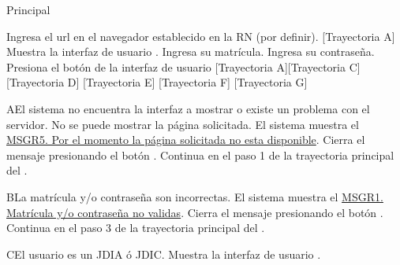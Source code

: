 \begin{UCtrayectoria}{Principal}
    
    \UCpaso[\UCactor] Ingresa el url en el navegador establecido en la RN (por definir). [Trayectoria A] 
    \UCpaso Muestra la interfaz de usuario .
    \UCpaso[\UCactor] Ingresa su matrícula.
    \UCpaso[\UCactor] Ingresa su contraseña.
    \UCpaso[\UCactor] Presiona el botón  de la interfaz de usuario   [Trayectoria A][Trayectoria C] [Trayectoria D] [Trayectoria E] [Trayectoria F] [Trayectoria G]
\end{UCtrayectoria}


\begin{UCtrayectoriaA}{A}{El sistema no encuentra la interfaz a mostrar o existe un problema con el servidor.}
    \UCpaso No se puede mostrar la página solicitada.
    \UCpaso El sistema muestra el \hyperref[MSGR5]{MSGR5. Por el momento la página solicitada no esta disponible}.
    \UCpaso[\UCactor] Cierra el mensaje presionando el botón .
    \UCpaso Continua en el paso 1 de la trayectoria principal del .
\end{UCtrayectoriaA}


\begin{UCtrayectoriaA}{B}{La matrícula y/o contraseña son incorrectas.}
    \UCpaso El sistema muestra el  \hyperref[MSGR1]{MSGR1. Matrícula y/o contraseña no validas}.
    \UCpaso[\UCactor] Cierra el mensaje presionando el botón .
    \UCpaso Continua en el paso 3 de la trayectoria principal del .
\end{UCtrayectoriaA}



\begin{UCtrayectoriaA}{C}{El usuario es un JDIA ó JDIC.}
    \UCpaso Muestra la interfaz de usuario .
\end{UCtrayectoriaA}


